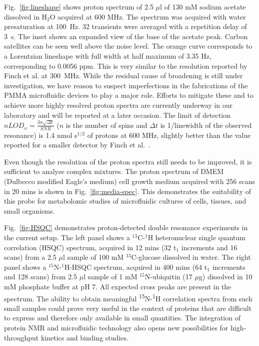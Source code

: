 \documentclass[preprint,5p]{elsarticle}
\newcommand{\fig}[1]{Fig.~\ref{#1}}
\begin{document}
\fig{fig:lineshape} shows proton spectrum of 2.5 $\mu$l of 130 mM  sodium
acetate dissolved in H$_2$O acquired at 600 MHz. The spectrum was acquired with
water presaturation at 100~Hz. 32 transients were averaged with a repetition
delay of 3~s. The inset shows an expanded view of the base of the acetate peak.
Carbon satellites can be seen well above the noise level. The orange curve
corresponds to a Lorentzian lineshape with full width at half maximum of 3.35
Hz, corresponding to 0.0056 ppm. This is very similar to the resolution reported
by Finch et al. at 300~MHz. While the residual cause of broadening is still
under investigation, we have reason to suspect imperfections in the fabrications
of the PMMA microfluidic devices to play a major role. Efforts to mitigate these
and to achieve more highly resolved proton spectra are currently underway in our
laboratory and will be reported at a later occasion.  The limit of detection
$nLOD_{\omega}=\frac{3n\sqrt{{\Delta}t}}{SNR}$ ($n$ is the number of spins and
$\Delta t$ is 1/linewidth of the observed resonance) is 1.4 nmol s$^{1/2}$ of
protons at 600 MHz, slightly better than the value reported for a smaller
detector by Finch et al.~\cite{gream_2016}.



Even though the resolution of the proton spectra still needs to be improved, it
is sufficient to analyse complex mixtures. The proton spectrum of DMEM (Dulbecco
modified Eagle's medium) cell growth medium acquired with 256 scans in 20 mins
is shown in \fig{fig:media-spec}. This demonstrates the suitability of this
probe for metabolomic studies of microfluidic cultures of cells, tissues, and
small organisms.

\fig{fig:HSQC} demonstrates proton-detected double resonance experiments in the
current setup. The left panel shows a $^{13}$C-$^{1}$H heteronuclear single
quantum correlation (HSQC) spectrum, acquired in 12 mins (32 t$_1$ increments
and 16 scans) from a 2.5 $\mu$l sample of 100 mM $^{13}$C-glucose dissolved in
water. The right panel shows a $^{15}$N-$^{1}$H-HSQC spectrum, acquired in 400
mins (64 t$_1$ increments and 128 scans) from 2.5 $\mu$l sample of 1 mM
$^{15}$N-ubiquitin (17 $\mu$g) dissolved in 10 mM phosphate buffer at pH 7. All
expected cross peaks are present in the spectrum. The ability to obtain
meaningful  \textsuperscript{15}N-\textsuperscript{1}H correlation spectra from
such small samples could prove very useful in the context of proteins that are
difficult to express and therefore only available in small quantities. The
integration of protein NMR and microfluidic technology also opens new
possibilities for high-throughput kinetics and binding studies.
\end{document}
